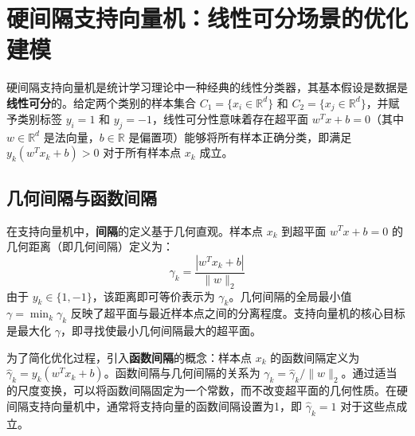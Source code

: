 \documentclass{article}
\newenvironment{solution_cn}{%
  \begin{proof}[解答]%
}{%
  \end{proof}%
}
\begin{document}
\begin{solution_cn} 
\normalsize
\quad \\ 
\begin{abstract}
支持向量机（Support Vector Machine, SVM）是机器学习史上一个里程碑式的模型，其核心思想可归结为一个凸优化问题。本文从优化建模的视角，系统性地展示了SVM的理论演进。首先阐述SVM如何从一个理想化的\textbf{线性可分硬间隔模型}出发，通过引入\textbf{松弛变量}与\textbf{惩罚因子}，演进为能够处理线性不可分情况的\textbf{软间隔模型}。随后，深入剖析其\textbf{凸优化本质}与\textbf{拉格朗日对偶理论}，揭示了该理论不仅为SVM提供了高效求解路径，更催生了赋予其强大非线性处理能力的\textbf{核方法}。进而，探讨了包括$\nu$-SVM、支持向量回归（SVR）在内的关键变体及其优化模型。SVM理论将在自适应核学习、与深度学习的融合以及面向隐私保护的分布式计算等方向继续发展，成为现代机器学习知识体系中不可或缺的组成部分。
\end{abstract}

\section{硬间隔支持向量机：线性可分场景的优化建模}

硬间隔支持向量机是统计学习理论中一种经典的线性分类器，其基本假设是数据是\textbf{线性可分}的。给定两个类别的样本集合 $ C_1 = \{x_i \in \mathbb{R}^d\} $ 和 $ C_2 = \{x_j \in \mathbb{R}^d\} $，并赋予类别标签 $ y_i = 1 $ 和 $ y_j = -1 $，线性可分性意味着存在超平面 $ w^T x + b = 0 $（其中 $ w \in \mathbb{R}^d $ 是法向量，$ b \in \mathbb{R} $ 是偏置项）能够将所有样本正确分类，即满足 $ y_k (w^T x_k + b) > 0 $ 对于所有样本点 $ x_k $ 成立。

\subsection{几何间隔与函数间隔}

在支持向量机中，\textbf{间隔}的定义基于几何直观。样本点 $ x_k $ 到超平面 $ w^T x + b = 0 $ 的几何距离（即几何间隔）定义为：
\begin{equation}
\gamma_k = \frac{|w^T x_k + b|}{\|w\|_2}
\end{equation}
由于 $ y_k \in \{1, -1\} $，该距离即可等价表示为 $\gamma_k$。几何间隔的全局最小值 $ \gamma = \min_k \gamma_k $ 反映了超平面与最近样本点之间的分离程度。支持向量机的核心目标是最大化 $ \gamma $，即寻找使最小几何间隔最大的超平面。

为了简化优化过程，引入\textbf{函数间隔}的概念：样本点 $ x_k $ 的函数间隔定义为 $ \hat{\gamma}_k = y_k (w^T x_k + b) $。函数间隔与几何间隔的关系为 $ \gamma_k = \hat{\gamma}_k / \|w\|_2 $。通过适当的尺度变换，可以将函数间隔固定为一个常数，而不改变超平面的几何性质。在硬间隔支持向量机中，通常将支持向量的函数间隔设置为1，即 $ \hat{\gamma}_k = 1 $ 对于这些点成立。


\end{solution_cn}
\end{document}
